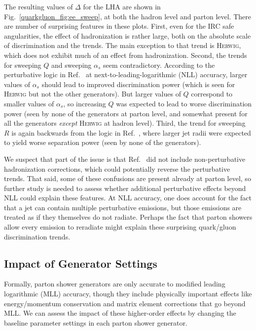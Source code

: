 \documentclass[11pt]{cernrep}
\begin{document}
The resulting values of $\Delta$ for the LHA are shown in Fig.~\ref{quarkgluon_fig:ee_sweep}, at both the hadron level and parton level.   There are number of surprising features in these plots.  First, even for the IRC safe angularities, the effect of hadronization is rather large, both on the absolute scale of discrimination and the trends.  The main exception to that trend is \textsc{Herwig}, which does not exhibit much of an effect from hadronization.  Second, the trends for sweeping $Q$ and sweeping $\alpha_s$  seem contradictory.  According to the perturbative logic in Ref.~\cite{Larkoski:2013eya} at next-to-leading-logarithmic (NLL) accuracy, larger values of $\alpha_s$ should lead to improved discrimination power (which is seen for \textsc{Herwig} but not the other generators).  But larger values of $Q$ correspond to smaller values of $\alpha_s$, so increasing $Q$ was expected to lead to worse discrimination power (seen by none of the generators at parton level, and somewhat present for all the generators \emph{except} \textsc{Herwig} at hadron level).  Third, the trend for sweeping $R$ is again backwards from the logic in Ref.~\cite{Larkoski:2013eya}, where larger jet radii were expected to yield worse separation power (seen by none of the generators).

We suspect that part of the issue is that Ref.~\cite{Larkoski:2013eya} did not include non-perturbative hadronization corrections, which could potentially reverse the perturbative trends.  That said, some of these confusions are present already at parton level, so further study is needed to assess whether additional perturbative effects beyond NLL could explain these features.  At NLL accuracy, one does account for the fact that a jet can contain multiple perturbative emissions, but those emissions are treated as if they themselves do not radiate.  Perhaps the fact that parton showers allow every emission to reradiate might explain these surprising quark/gluon discrimination trends.

\subsection{Impact of Generator Settings}
\label{quarkgluon_sec:ee_settings}

Formally, parton shower generators are only accurate to modified leading logarithmic (MLL) accuracy, though they include physically important effects like energy/momentum conservation and matrix element corrections that go beyond MLL.  We can assess the impact of these higher-order effects by changing the baseline parameter settings in each parton shower generator.  
\end{document}
